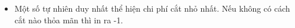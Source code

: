 \begin{itemize}
	\item Một số tự nhiên duy nhất thể hiện chi phí cắt nhỏ nhất. Nếu không có cách cắt nào thỏa mãn thì in ra -1.
\end{itemize}